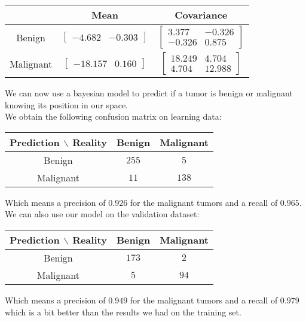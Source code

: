 \documentclass[a4paper, 10pt]{article}
\begin{document}
\begin{center}
    \begin{tabular}{ |c|c|c| }
        \hline
        \ & Mean & Covariance \\
        \hline
        Benign & $\begin{bmatrix}
            -4.682 & -0.303
        \end{bmatrix}$ & $\begin{bmatrix}
            3.377 & -0.326\\
            -0.326 & 0.875
        \end{bmatrix}$ \\
        \hline
        Malignant & $\begin{bmatrix}
            -18.157 & 0.160
        \end{bmatrix}$ & $\begin{bmatrix}
            18.249 & 4.704\\
            4.704 & 12.988
        \end{bmatrix}$ \\ 
        \hline
    \end{tabular}
\end{center}
We can now use a bayesian model to predict if a tumor is benign or malignant knowing its position in our space.
\\
We obtain the following confusion matrix on learning data:
\begin{center}
    \begin{tabular}{ |c|c|c| }
        \hline
        Prediction $\backslash$ Reality & Benign & Malignant \\
        \hline
        Benign & $255$ & $5$ \\
        \hline
        Malignant & $11$ & $138$ \\ 
        \hline
    \end{tabular}
\end{center}
Which means a precision of $0.926$ for the malignant tumors and a recall of $0.965$.
\\
We can also use our model on the validation dataset:
\begin{center}
    \begin{tabular}{ |c|c|c| }
        \hline
        Prediction $\backslash$ Reality & Benign & Malignant \\
        \hline
        Benign & $173$ & $2$ \\
        \hline
        Malignant & $5$ & $94$ \\ 
        \hline
    \end{tabular}
\end{center}
Which means a precision of $0.949$ for the malignant tumors and a recall of $0.979$ which is a bit better than 
the results we had on the training set.
\end{document}
